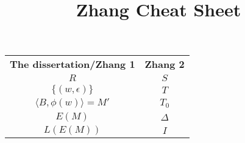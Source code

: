 \documentclass{lmaths}
\title{Zhang Cheat Sheet}
\author{}
\begin{document}
\maketitle

\centering
\begin{tabular}{cc}
	\textbf{The dissertation/Zhang 1} & \textbf{Zhang 2} \\
	$R$ & $S$ \\
	$\{(w, \epsilon)\}$ & $T$ \\
	$\langle B, \phi(w) \rangle = M'$ & $T_0$ \\
	$E(M)$ & $\Delta$ \\
	$L(E(M))$ & $I$
\end{tabular}
\end{document}
